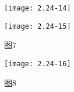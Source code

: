 \begin{figure}[H] %
	\begin{minipage}{\linewidth}
		\texttt{[image: 2.24-14]}
	\end{minipage}
\end{figure}

		\begin{figure}[H] %
	\begin{minipage}{\linewidth}
		\texttt{[image: 2.24-15]}
	\end{minipage}
	\caption*{图7} %
\end{figure}

\begin{figure}[H] %
	\begin{minipage}{\linewidth}
		\texttt{[image: 2.24-16]}
	\end{minipage}
	\caption*{图8} %
\end{figure}














